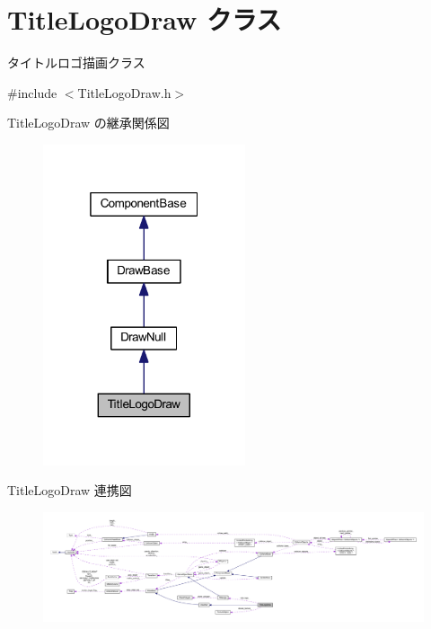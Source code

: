 \hypertarget{class_title_logo_draw}{}\section{Title\+Logo\+Draw クラス}
\label{class_title_logo_draw}


タイトルロゴ描画クラス  




{\ttfamily \#include $<$Title\+Logo\+Draw.\+h$>$}



Title\+Logo\+Draw の継承関係図\nopagebreak
\begin{figure}[H]
\begin{center}
\leavevmode
\includegraphics[width=169pt]{class_title_logo_draw__inherit__graph}
\end{center}
\end{figure}


Title\+Logo\+Draw 連携図\nopagebreak
\begin{figure}[H]
\begin{center}
\leavevmode
\includegraphics[width=350pt]{class_title_logo_draw__coll__graph}
\end{center}
\end{figure}
